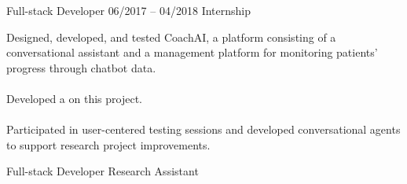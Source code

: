 \documentclass[9pt, green]{template/developercv} %
\begin{document}
{\begin{entrylist}
{		
	   }
		{Full-stack Developer}
	\entry
	{06/2017 -- 04/2018}
	{}
	{Internship}
	{
		\vspace{0.4mm}
		\begin{minipage}[t]{0.75\textwidth} %
			\vspace{-\baselineskip} \small
			\vspace{-2mm}
			\itemmarker Designed, developed, and tested CoachAI, a platform consisting of a conversational assistant and a management platform for monitoring patients' progress through chatbot data.\\
			\vspace{-3mm}\\
			\itemmarker Developed a  on this project.\\
			\vspace{-3mm}\\
			\itemmarker Participated in user-centered testing sessions and developed conversational agents to support research project improvements.
		\end{minipage}
		
	}
	{Full-stack Developer \space\cpipe\space Research Assistant}
\end{entrylist}


\vspace{-4mm}
\begin{minipage}[t]{0.32\textwidth}
	\vspace{-\baselineskip} %


\end{minipage}}
\end{document}

